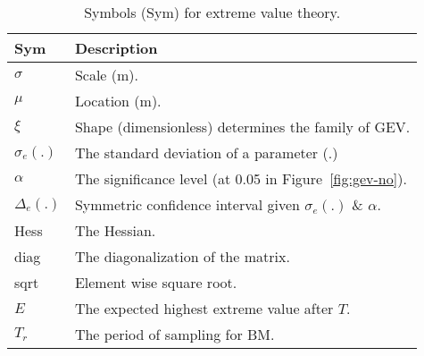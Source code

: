 \begin{table}[h!]
    \centering
    \begin{tabular}{ll}
    \hline \hline
    \textbf{Sym} & \textbf{Description} \\
    \hline
        $\sigma$ & Scale (m). \\
        $\mu$ & Location (m). \\
        $\xi$ & Shape (dimensionless) determines the family of GEV. \\
        $\sigma_e(.)$ & The standard deviation of a parameter (.)\\
        $\alpha$ & The significance level (at 0.05 in Figure~\ref{fig:gev-no}).\\
        $\Delta_e(.)$ & Symmetric confidence interval given $\sigma_e(.)$ \& $\alpha$. \\
        Hess & The Hessian.\\
        diag & The diagonalization of the matrix. \\
        sqrt & Element wise square root.\\
        $E$ & The expected highest extreme value after $T$.\\
        $T_r$ & The period of sampling for BM. \\
    \hline \hline
    \end{tabular}
    \caption{Symbols (Sym) for extreme value theory.}
    \label{tab:fluid_variables}
\end{table}
